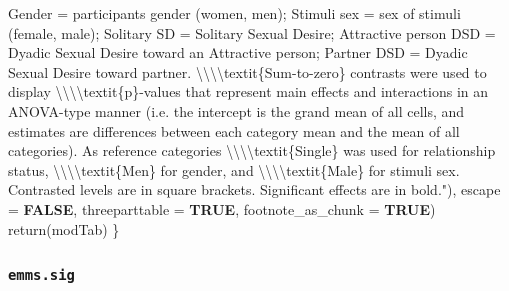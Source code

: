\documentclass[
  bookmarksnumbered]{article}
\newenvironment{Shaded}{\begin{snugshade}}{\end{snugshade}}
\newcommand{\AttributeTok}[1]{\textcolor[rgb]{0.80,0.80,0.80}{#1}}
\newcommand{\ConstantTok}[1]{\textcolor[rgb]{0.86,0.64,0.64}{\textbf{#1}}}
\newcommand{\FunctionTok}[1]{\textcolor[rgb]{0.94,0.94,0.56}{#1}}
\newcommand{\NormalTok}[1]{\textcolor[rgb]{0.80,0.80,0.80}{#1}}
\newcommand{\SpecialCharTok}[1]{\textcolor[rgb]{0.86,0.64,0.64}{#1}}
\newcommand{\StringTok}[1]{\textcolor[rgb]{0.80,0.58,0.58}{#1}}
\begin{document}
\begin{Shaded}
\begin{Highlighting}[]
\StringTok{                              Gender = participants gender (women, men); }
\StringTok{                              Stimuli sex = sex of stimuli (female, male); }
\StringTok{                              Solitary SD = Solitary Sexual Desire;}
\StringTok{                              Attractive person DSD = Dyadic Sexual Desire toward an }
\StringTok{                              Attractive person;}
\StringTok{                              Partner DSD = Dyadic Sexual Desire toward partner.}
\StringTok{                              }\SpecialCharTok{\textbackslash{}\textbackslash{}\textbackslash{}\textbackslash{}}\StringTok{textit\{Sum{-}to{-}zero\} contrasts were used to display}
\StringTok{                              }\SpecialCharTok{\textbackslash{}\textbackslash{}\textbackslash{}\textbackslash{}}\StringTok{textit\{p\}{-}values that represent main effects and interactions }
\StringTok{                              in an ANOVA{-}type manner (i.e. the intercept is the grand mean of }
\StringTok{                              all cells, and estimates are differences between each category}
\StringTok{                              mean and the mean of all categories).}
\StringTok{                              As reference categories }
\StringTok{                              }\SpecialCharTok{\textbackslash{}\textbackslash{}\textbackslash{}\textbackslash{}}\StringTok{textit\{Single\} was used for relationship status,}
\StringTok{                              }\SpecialCharTok{\textbackslash{}\textbackslash{}\textbackslash{}\textbackslash{}}\StringTok{textit\{Men\} for gender,}
\StringTok{                              and }\SpecialCharTok{\textbackslash{}\textbackslash{}\textbackslash{}\textbackslash{}}\StringTok{textit\{Male\} for stimuli sex. }
\StringTok{                              Contrasted levels are in square brackets. }
\StringTok{                              Significant effects are in bold."}\NormalTok{),}
             \AttributeTok{escape =} \ConstantTok{FALSE}\NormalTok{,}
             \AttributeTok{threeparttable =} \ConstantTok{TRUE}\NormalTok{,}
             \AttributeTok{footnote\_as\_chunk =} \ConstantTok{TRUE}\NormalTok{)}
    \FunctionTok{return}\NormalTok{(modTab)}
\NormalTok{\}}
\end{Highlighting}
\end{Shaded}

\subsubsection{\texorpdfstring{\texttt{emms.sig}}{emms.sig}}\label{emms.sig}
\end{document}
